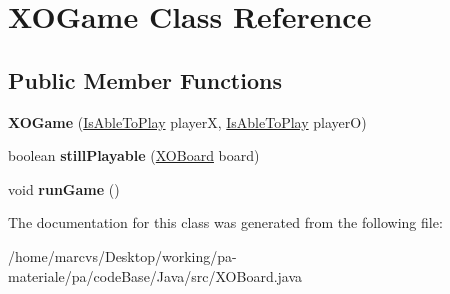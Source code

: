 \hypertarget{classXOGame}{
\section{XOGame Class Reference}
\label{classXOGame}
}
\subsection*{Public Member Functions}
\begin{DoxyCompactItemize}
\item 
\hypertarget{classXOGame_ad9a61180a3d0b124c65cec1410ddccf5}{
{\bfseries XOGame} (\hyperlink{interfaceIsAbleToPlay}{IsAbleToPlay} playerX, \hyperlink{interfaceIsAbleToPlay}{IsAbleToPlay} playerO)}
\label{classXOGame_ad9a61180a3d0b124c65cec1410ddccf5}

\item 
\hypertarget{classXOGame_a3d4029704a35c962df7e640eafe646eb}{
boolean {\bfseries stillPlayable} (\hyperlink{classXOBoard}{XOBoard} board)}
\label{classXOGame_a3d4029704a35c962df7e640eafe646eb}

\item 
\hypertarget{classXOGame_aa469163bceb486fce00d516fd0c0be31}{
void {\bfseries runGame} ()}
\label{classXOGame_aa469163bceb486fce00d516fd0c0be31}

\end{DoxyCompactItemize}


The documentation for this class was generated from the following file:\begin{DoxyCompactItemize}
\item 
/home/marcvs/Desktop/working/pa-\/materiale/pa/codeBase/Java/src/XOBoard.java\end{DoxyCompactItemize}
